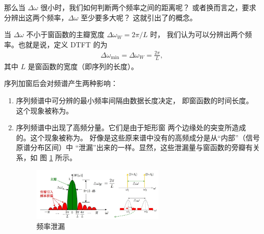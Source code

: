 \begin{definition}[频谱分辨率]
    那么当 $\Delta\omega$ 很小时，我们如何判断两个频率之间的距离呢？
    或者换而言之，要求分辨出这两个频率，$\Delta\omega$ 至少要多大呢？
    这就引出了的概念。

    当 $\Delta\omega$ 不小于窗函数的主瓣宽度 $\Delta\omega_W = 2\pi/L$ 时，
    我们认为可以分辨出两个频率。也就是说，定义 DTFT 的为
    \begin{align*}
        \Delta\omega_{\min} = \Delta\omega_W = \frac{2\pi}{L},
    \end{align*}
    其中 $L$ 是窗函数的宽度（即序列的长度）。
\end{definition}

\begin{remark}
    序列加窗后会对频谱产生两种影响：
    \begin{enumerate}
        \item 序列频谱中可分辨的最小频率间隔由数据长度决定，
            即窗函数的时间长度。这个现象被称为。
        \item 序列频谱中出现了高频分量。它们是由于矩形窗
            两个边缘处的突变所造成的。这个现象被称为。
            好像是这些原来谱中没有的高频成分是从``内部''（信号原谱分布区间）中
            ``泄漏''出来的一样。显然，这些泄漏量与窗函数的旁瓣有关系，如
            图 \ref{fig:DTFT_leakage.png} 所示。
            \begin{figure}[H]
                \centering
                \includegraphics[width=0.6\textwidth]{chap3/img/DTFT_leakage.png}
                \caption{频率泄漏}
                \label{fig:DTFT_leakage.png}
            \end{figure}
    \end{enumerate}
\end{remark}
